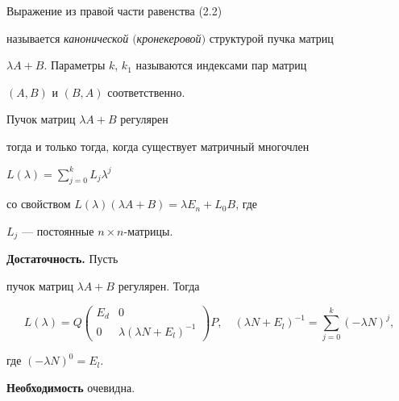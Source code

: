 \begin{defns}


Выражение из правой части равенства (2.2)


называется {\em канонической $($кронекеровой$)$} структурой пучка матриц


$\lambda A + B$. Параметры $k$, $k_1$ называются индексами пар матриц


$(A,B)$ и $(B,A)$ соответственно.


\end{defns}





\begin{lems}


Пучок матриц $\lambda A + B$ регулярен


тогда и только тогда, когда существует матричный многочлен


$L(\lambda )=\sum \limits ^{k}_{j=0}L_j\lambda ^j$


со свойством $L(\lambda )(\lambda A+B)=\lambda E_n+L_0B$, где


$L_j$ --- постоянные $n\times n$-матрицы.


\end{lems}





\begin{pf}


{\bf Достаточность.} Пусть


пучок матриц $\lambda A + B$ регулярен. Тогда


\begin{equation}


L(\lambda )=Q


\begin{pmatrix}


E_{d} & 0\\ 0 & \lambda (\lambda N+ E_{l})^{-1}


\end{pmatrix}P,\quad


(\lambda N+ E_{l})^{-1}=\sum \limits ^{k}_{j=0}(-\lambda N)^j,


\end{equation}


где $(-\lambda N)^0=E_l$.





{\bf Необходимость} очевидна.


\end{pf}





